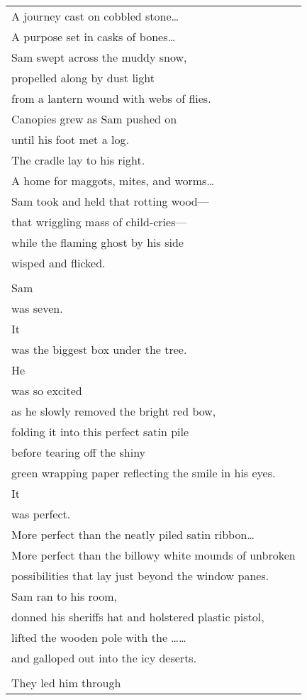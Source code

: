 \documentclass{article}
\begin{document}
\begin{center}
\begin{tabular}{l}
A journey cast on cobbled stone\ldots \\
A purpose set in casks of bones\ldots \\
Sam swept across the muddy snow, \\
propelled along by dust light \\
from a lantern wound with webs of flies. \\
Canopies grew as Sam pushed on \\
until his foot met a log. \\
The cradle lay to his right. \\
A home for maggots, mites, and worms\ldots \\
Sam took and held that rotting wood--- \\
that wriggling mass of child-cries--- \\
while the flaming ghost by his side \\
wisped and flicked. \\
\\
Sam \\
was seven. \\
It \\
was the biggest box under the tree. \\
He \\
was so excited \\
as he slowly removed the bright red bow, \\
folding it into this perfect satin pile \\
before tearing off the shiny \\
green wrapping paper reflecting the smile in his eyes. \\
It \\
was perfect. \\
More perfect than the neatly piled satin ribbon\ldots \\
More perfect than the billowy white mounds of unbroken \\
possibilities that lay just beyond the window panes. \\
Sam ran to his room, \\
donned his sheriffs hat and holstered plastic pistol, \\
lifted the wooden pole with the \ldots \ldots \\
and galloped out into the icy deserts.
\\
\\
They led him through \\

\end{tabular}
\end{center}
\end{document}
